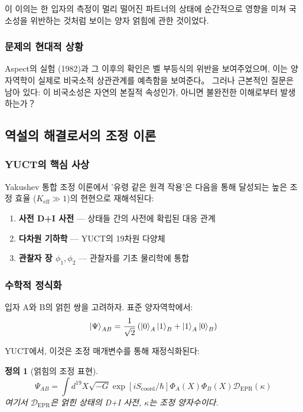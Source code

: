 \documentclass[11pt,a4paper]{article}
\newtheorem{definition}{정의}
\begin{document}
이 이의는 한 입자의 측정이 멀리 떨어진 파트너의 상태에 순간적으로 영향을 미쳐 국소성을 위반하는 것처럼 보이는 양자 얽힘에 관한 것이었다.

\subsubsection{문제의 현대적 상황}
Aspect의 실험 (1982)과 그 이후의 확인은 벨 부등식의 위반을 보여주었으며, 이는 양자역학이 실제로 비국소적 상관관계를 예측함을 보여준다。 그러나 근본적인 질문은 남아 있다: 이 비국소성은 자연의 본질적 속성인가, 아니면 불완전한 이해로부터 발생하는가？

\subsection{역설의 해결로서의 조정 이론}
\label{subsec:yuct-solution}

\subsubsection{YUCT의 핵심 사상}
Yakushev 통합 조정 이론에서 '유령 같은 원격 작용'은 다음을 통해 달성되는 높은 조정 효율 ($K_{\mathrm{eff}} \gg 1$)의 현현으로 재해석된다:

\begin{enumerate}
\item \textbf{사전 D+I 사전} — 상태들 간의 사전에 확립된 대응 관계
\item \textbf{다차원 기하학} — YUCT의 19차원 다양체
\item \textbf{관찰자 장 $\phi_1, \phi_2$} — 관찰자를 기초 물리학에 통합
\end{enumerate}

\subsubsection{수학적 정식화}
입자 A와 B의 얽힌 쌍을 고려하자. 표준 양자역학에서:
\begin{equation}
\ket{\Psi}_{AB} = \frac{1}{\sqrt{2}} \left( \ket{0}_A \ket{1}_B + \ket{1}_A \ket{0}_B \right)
\end{equation}

YUCT에서, 이것은 조정 매개변수를 통해 재정식화된다:

\begin{definition}[얽힘의 조정 표현]
\begin{equation}
	\Psi_{AB} = \int d^{19}X \sqrt{-G} \exp\left[i S_{\text{coord}}/\hbar\right] \Phi_A(X) \Phi_B(X) \mathcal{D}_{\text{EPR}}(\kappa)
\end{equation}
여기서 $\mathcal{D}_{\text{EPR}}$은 얽힌 상태의 D+I 사전, $\kappa$는 조정 양자수이다.
\end{definition}
\end{document}
